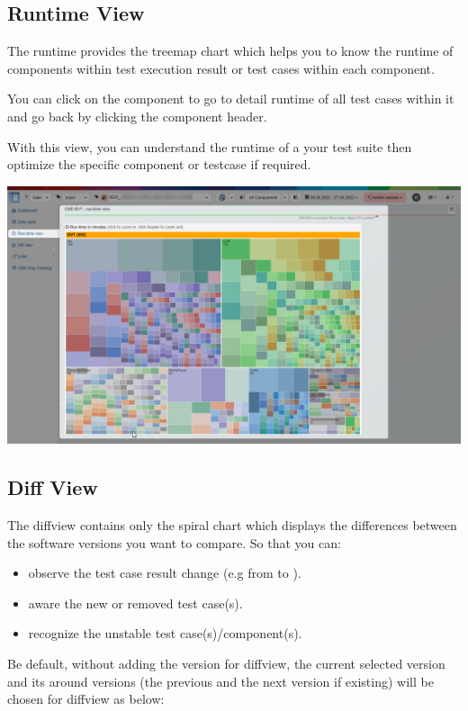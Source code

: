 \hypertarget{runtime-view}{%
\subsection{Runtime View}\label{runtime-view}}
The runtime provides the treemap chart which helps you to know the runtime of 
components within test execution result or test cases within each component.

You can click on the component to go to detail runtime of all test cases within 
it and go back by clicking the component header.

With this view, you can understand the runtime of a your test suite then 
optimize the specific component or testcase if required.

\includegraphics[width=1\linewidth]{./pictures/view_runtime.png}

\hypertarget{diff-view}{%
\subsection{Diff View}\label{diff-view}}
The diffview contains only the spiral chart which displays the differences 
between the software versions you want to compare. So that you can:
\begin{itemize}
   \item observe the test case result change (e.g from  to 
         ).
   \item aware the new or removed test case(s).
   \item recognize the unstable test case(s)/component(s).
\end{itemize}

Be default, without adding the version for diffview, the current selected 
version and its around versions (the previous and the next version if existing) 
will be chosen for diffview as below:


